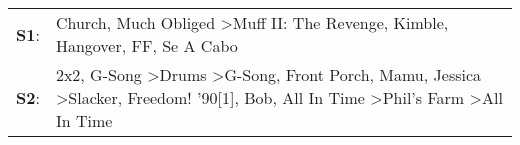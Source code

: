 \begin{supertabular}{p{0.03\textwidth}p{0.92\textwidth}}
 \textbf{S1}:  &                                                                                                                                                                                                                                                                     Church\textsuperscript{}, \enspace Much Obliged\textsuperscript{} \textgreater \enspace Muff II: The Revenge\textsuperscript{}, \enspace Kimble\textsuperscript{}, \enspace Hangover\textsuperscript{}, \enspace FF\textsuperscript{}, \enspace Se A Cabo\textsuperscript{}  \enspace  \\
 \textbf{S2}:  &  2x2\textsuperscript{}, \enspace G-Song\textsuperscript{} \textgreater \enspace Drums\textsuperscript{} \textgreater \enspace G-Song\textsuperscript{}, \enspace Front Porch\textsuperscript{}, \enspace Mamu\textsuperscript{}, \enspace Jessica\textsuperscript{} \textgreater \enspace Slacker\textsuperscript{}, \enspace Freedom! '90[1]\textsuperscript{}, \enspace Bob\textsuperscript{}, \enspace All In Time\textsuperscript{} \textgreater \enspace Phil's Farm\textsuperscript{} \textgreater \enspace All In Time\textsuperscript{}  \enspace  \\
\end{supertabular}
